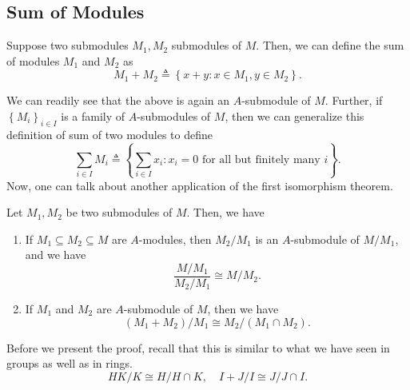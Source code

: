 \subsection{Sum of Modules}
\begin{definition}
    Suppose two submodules $M_{1}, M_{2}$ submodules of $M$. Then, we can define the sum of modules $M_1$ and $M_2$ as 
    \[M_{1}+M_{2}\triangleq\left\{x+y: x \in M_{1}, y \in M_{2}\right\}.\]
\end{definition}
We can readily see that the above is again an $A$-submodule of $M$. Further, if $\left\{M_{i}\right\}_{i \in I}$ is a family of $A$-submodules of $M$, then we can generalize this definition of sum of two modules to define
$$
\sum_{i \in I} M_{i}\triangleq\left\{\sum_{i \in I} x_{i}: x_{i}=0 \text { for all but finitely many } i\right\}.
$$
Now, one can talk about another application of the first isomorphism theorem. 
\begin{proposition}\label{prop: div-sum-quotient}
Let $M_{1}, M_{2}$ be two submodules of $M$. Then, we have
\begin{enumerate}
    \item \label{item: div-sum-quotient-1} If $M_{1} \subseteq M_{2} \subseteq M$ are $A$-modules, then $M_{2} / M_{1}$ is an $A$-submodule of $M / M_{1}$, and we have 
    \[\frac{M / M_{1}}{M_{2} / M_{1}} \cong M / M_{2}.\]
    \item \label{item: div-sum-quotient-2} If $M_{1}$ and $M_{2}$ are $A$-submodule of $M$, then we have
    \[(M_{1}+M_{2})/M_{1} \cong M_{2}/(M_{1} \cap M_{2}).\]
\end{enumerate}
\end{proposition}
Before we present the proof, recall that this is similar to what we have seen in groups as well as in rings. 
\[H K / K \cong H / H \cap K,\quad I+J / I \cong J / J \cap I.\] 
